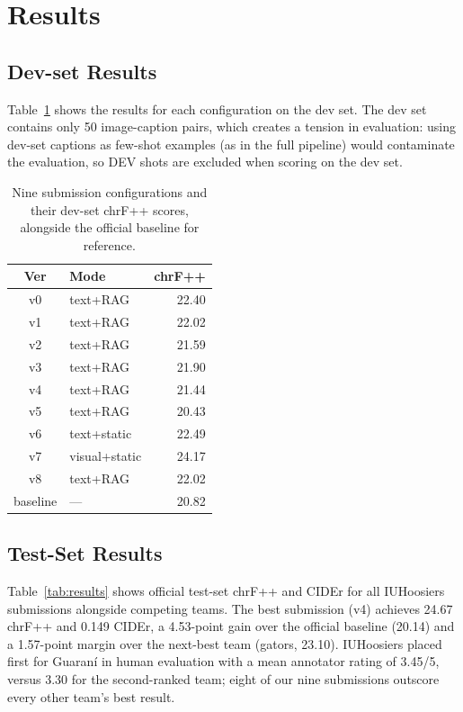 \documentclass[11pt]{article}
\begin{document}
\section{Results}
\subsection{Dev-set Results}
Table~\ref{tab:devresult} shows the results for each configuration on the dev set. The dev set contains only 50 image-caption pairs, which creates a tension in evaluation: using dev-set captions as few-shot examples (as in the full pipeline) would contaminate the evaluation, so DEV shots are excluded when scoring on the dev set. 


\begin{table}[t]
\centering
\small
\setlength{\tabcolsep}{3pt}
\begin{tabular}{clr}
\toprule
\textbf{Ver} & \textbf{Mode} & \textbf{chrF++} \\
\midrule
v0 & text+RAG      & 22.40 \\
v1 & text+RAG      & 22.02 \\
v2 & text+RAG      & 21.59 \\
v3 & text+RAG      & 21.90 \\
v4 & text+RAG      & 21.44 \\
v5 & text+RAG      & 20.43 \\
v6 & text+static   & 22.49 \\
v7 & visual+static & 24.17 \\
v8 & text+RAG      & 22.02 \\
\midrule
baseline & — & 20.82 \\
\bottomrule
\end{tabular}
\caption{Nine submission configurations and their dev-set chrF++ scores, alongside the official baseline for reference.}
\label{tab:devresult}
\end{table}

\subsection{Test-Set Results}

Table~\ref{tab:results} shows official test-set chrF++ and CIDEr for all IUHoosiers submissions alongside competing teams. The best submission (v4) achieves 24.67 chrF++ and 0.149 CIDEr, a 4.53-point gain over the official baseline (20.14) and a 1.57-point margin
over the next-best team (gators, 23.10). IUHoosiers placed first for Guaran\'{i} in human evaluation with a mean annotator rating of 3.45/5, versus 3.30 for the second-ranked team; eight of our nine submissions outscore every other team's best result.
\end{document}
